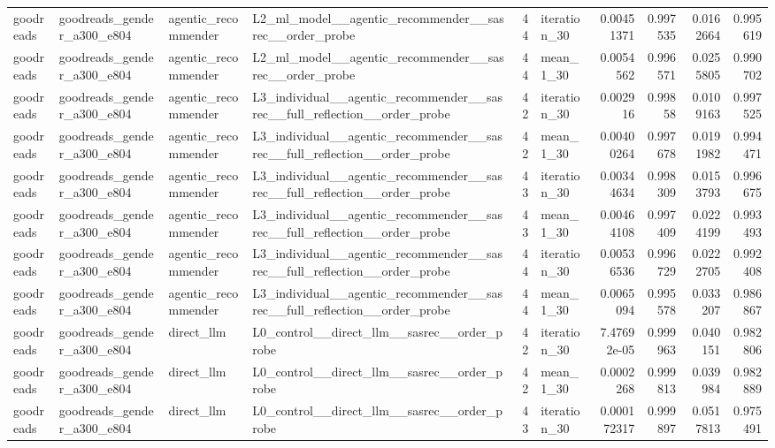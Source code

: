 \begin{table}[htbp!]
\begin{tabular}{llllrlrrrr}
goodreads & goodreads\_gender\_a300\_e804 & agentic\_recommender & L2\_ml\_model\_\_agentic\_recommender\_\_sasrec\_\_order\_probe & 44 & iteration\_30 & 0.00451371 & 0.997535 & 0.0162664 & 0.995619 \\
goodreads & goodreads\_gender\_a300\_e804 & agentic\_recommender & L2\_ml\_model\_\_agentic\_recommender\_\_sasrec\_\_order\_probe & 44 & mean\_1\_30 & 0.0054562 & 0.996571 & 0.0255805 & 0.990702 \\
goodreads & goodreads\_gender\_a300\_e804 & agentic\_recommender & L3\_individual\_\_agentic\_recommender\_\_sasrec\_\_full\_reflection\_\_order\_probe & 42 & iteration\_30 & 0.002916 & 0.99858 & 0.0109163 & 0.997525 \\
goodreads & goodreads\_gender\_a300\_e804 & agentic\_recommender & L3\_individual\_\_agentic\_recommender\_\_sasrec\_\_full\_reflection\_\_order\_probe & 42 & mean\_1\_30 & 0.00400264 & 0.997678 & 0.0191982 & 0.994471 \\
goodreads & goodreads\_gender\_a300\_e804 & agentic\_recommender & L3\_individual\_\_agentic\_recommender\_\_sasrec\_\_full\_reflection\_\_order\_probe & 43 & iteration\_30 & 0.00344634 & 0.998309 & 0.0153793 & 0.996675 \\
goodreads & goodreads\_gender\_a300\_e804 & agentic\_recommender & L3\_individual\_\_agentic\_recommender\_\_sasrec\_\_full\_reflection\_\_order\_probe & 43 & mean\_1\_30 & 0.00464108 & 0.997409 & 0.0224199 & 0.993493 \\
goodreads & goodreads\_gender\_a300\_e804 & agentic\_recommender & L3\_individual\_\_agentic\_recommender\_\_sasrec\_\_full\_reflection\_\_order\_probe & 44 & iteration\_30 & 0.00536536 & 0.996729 & 0.0222705 & 0.992408 \\
goodreads & goodreads\_gender\_a300\_e804 & agentic\_recommender & L3\_individual\_\_agentic\_recommender\_\_sasrec\_\_full\_reflection\_\_order\_probe & 44 & mean\_1\_30 & 0.0065094 & 0.995578 & 0.033207 & 0.986867 \\
goodreads & goodreads\_gender\_a300\_e804 & direct\_llm & L0\_control\_\_direct\_llm\_\_sasrec\_\_order\_probe & 42 & iteration\_30 & 7.47692e-05 & 0.999963 & 0.040151 & 0.982806 \\
goodreads & goodreads\_gender\_a300\_e804 & direct\_llm & L0\_control\_\_direct\_llm\_\_sasrec\_\_order\_probe & 42 & mean\_1\_30 & 0.0002268 & 0.999813 & 0.039984 & 0.982889 \\
goodreads & goodreads\_gender\_a300\_e804 & direct\_llm & L0\_control\_\_direct\_llm\_\_sasrec\_\_order\_probe & 43 & iteration\_30 & 0.000172317 & 0.999897 & 0.0517813 & 0.975491 \\

\end{tabular}
\end{table}
